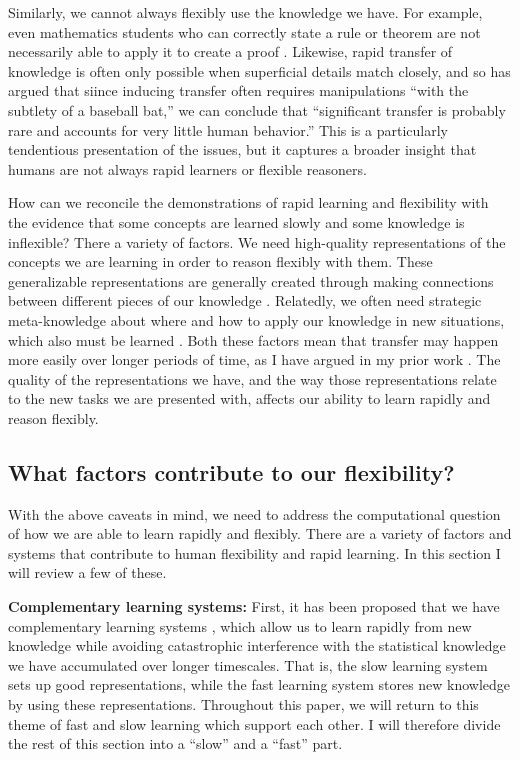\documentclass[11pt]{article}
\begin{document}
Similarly, we cannot always flexibly use the knowledge we have. For example, even mathematics students who can correctly state a rule or theorem are not necessarily able to apply it to create a proof \citep{Weber2001}. Likewise, rapid transfer of knowledge is often only possible when superficial details match closely, and so \citet{Detterman1993} has argued that siince inducing transfer often requires manipulations ``with the subtlety of a baseball bat,'' we can conclude that ``significant transfer is probably rare and accounts for very little human behavior.'' This is a particularly tendentious presentation of the issues, but it captures a broader insight that humans are not always rapid learners or flexible reasoners. \par 
How can we reconcile the demonstrations of rapid learning and flexibility with the evidence that some concepts are learned slowly and some knowledge is inflexible? There a variety of factors. We need high-quality representations of the concepts we are learning in order to reason flexibly with them. These generalizable representations are generally created through making connections between different pieces of our knowledge \citep{Wilensky1991, Schwartz2015}. Relatedly, we often need strategic meta-knowledge about where and how to apply our knowledge in new situations, which also must be learned \citep{Weber2001}. Both these factors mean that transfer may happen more easily over longer periods of time, as I have argued in my prior work \citep{Lampinen2017a}. The quality of the representations we have, and the way those representations relate to the new tasks we are presented with, affects our ability to learn rapidly and reason flexibly. \par 

\subsection{What factors contribute to our flexibility?}
With the above caveats in mind, we need to address the computational question of how we are able to learn rapidly and flexibly. There are a variety of factors and systems that contribute to human flexibility and rapid learning. In this section I will review a few of these. \par 

\textbf{Complementary learning systems:} First, it has been proposed that we have complementary learning systems \citep{McClelland1995, Kumaran2016}, which allow us to learn rapidly from new knowledge while avoiding catastrophic interference \citep{McCloskey1989} with the statistical knowledge we have accumulated over longer timescales. That is, the slow learning system sets up good representations, while the fast learning system stores new knowledge by using these representations. Throughout this paper, we will return to this theme of fast and slow learning which support each other. I will therefore divide the rest of this section into a ``slow'' and a ``fast'' part. \par
\end{document}
